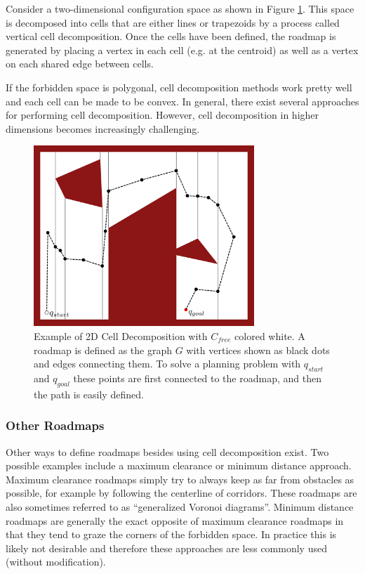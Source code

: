 \begin{example} \label{ex:celldecomp}
Consider a two-dimensional configuration space as shown in Figure \ref{fig:cell-decompsition}. This space is decomposed into cells that are either lines or trapezoids by a process called vertical cell decomposition. Once the cells have been defined, the roadmap is generated by placing a vertex in each cell (e.g. at the centroid) as well as a vertex on each shared edge between cells.

If the forbidden space is polygonal, cell decomposition methods work pretty well and each cell can be made to be convex. In general, there exist several approaches for performing cell decomposition. However, cell decomposition in higher dimensions becomes increasingly challenging.

\begin{figure}[ht]
\begin{center}
\includegraphics[width=0.74\textwidth]{tex/figs/ch06_figs/2d_cell_decomp.png}
\caption{Example of 2D Cell Decomposition with $C_{free}$ colored white. A roadmap is defined as the graph $G$ with vertices shown as black dots and edges connecting them. To solve a planning problem with $q_{start}$ and $q_{goal}$ these points are first connected to the roadmap, and then the path is easily defined.}
\label{fig:cell-decompsition}
\end{center}
\end{figure}
\end{example}

\subsubsection{Other Roadmaps}
Other ways to define roadmaps besides using cell decomposition exist. Two possible examples include a maximum clearance or minimum distance approach. Maximum clearance roadmaps simply try to always keep as far from obstacles as possible, for example by following the centerline of corridors. These roadmaps are also sometimes referred to as ``generalized Voronoi diagrams''. Minimum distance roadmaps are generally the exact opposite of maximum clearance roadmaps in that they tend to graze the corners of the forbidden space. In practice this is likely not desirable and therefore these approaches are less commonly used (without modification).

